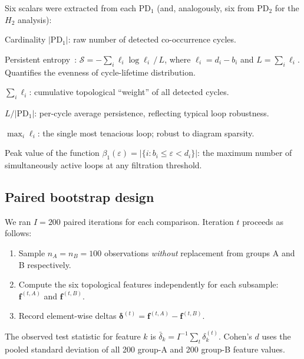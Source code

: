 Six scalars were extracted from each $\mathrm{PD}_1$ (and, analogously,
six from $\mathrm{PD}_2$ for the $H_2$ analysis):

\begin{description}[leftmargin=2.2em, itemsep=3pt]
  \item[\textbf{H1 count.}] Cardinality $|\mathrm{PD}_1|$: raw number of
  detected co-occurrence cycles.
  \item[\textbf{H1 entropy.}] Persistent entropy~\citep{patania2017topological}:
  $\mathcal{S} = -\sum_i \ell_i \log \ell_i \, / \, L$,
  where $\ell_i = d_i - b_i$ and $L = \sum_i \ell_i$.
  Quantifies the evenness of cycle-lifetime distribution.
  \item[\textbf{Total persistence.}] $\sum_i \ell_i$: cumulative
  topological ``weight'' of all detected cycles.
  \item[\textbf{Mean lifetime.}] $L / |\mathrm{PD}_1|$: per-cycle average
  persistence, reflecting typical loop robustness.
  \item[\textbf{Max lifetime.}] $\max_i \ell_i$: the single most
  tenacious loop; robust to diagram sparsity.
  \item[\textbf{Max Betti-1.}] Peak value of the function
  $\beta_1(\varepsilon) = |\{i : b_i \leq \varepsilon < d_i\}|$:
  the maximum number of simultaneously active loops at any filtration
  threshold.
\end{description}

\subsection{Paired bootstrap design}
\label{subsec:bootstrap}

We ran $I = 200$ paired iterations for each comparison.
Iteration $t$ proceeds as follows:
\begin{enumerate}[leftmargin=*, itemsep=2pt]
  \item Sample $n_A = n_B = 100$ observations \emph{without} replacement
  from groups A and B respectively.
  \item Compute the six topological features independently for each
  subsample: $\mathbf{f}^{(t,A)}$ and $\mathbf{f}^{(t,B)}$.
  \item Record element-wise deltas $\boldsymbol{\delta}^{(t)}
    = \mathbf{f}^{(t,A)} - \mathbf{f}^{(t,B)}$.
\end{enumerate}
The observed test statistic for feature $k$ is $\bar{\delta}_k
= I^{-1} \sum_t \delta_k^{(t)}$.
Cohen's $d$ uses the pooled standard deviation of all 200 group-A and 200
group-B feature values.


